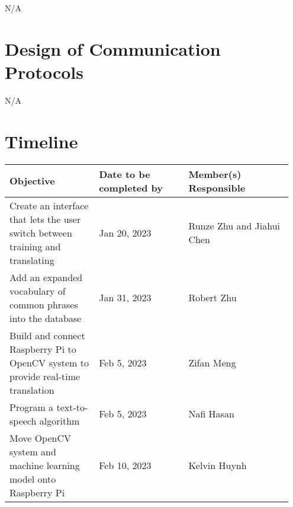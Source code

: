 \documentclass[12pt, titlepage]{article}
\begin{document}
N/A

\section{Design of Communication Protocols}

N/A

\section{Timeline}


\renewcommand{\arraystretch}{1.2}
\noindent \begin{tabularx}{\textwidth}{p{0.3\linewidth}|p{0.3\linewidth}|p{0.35\linewidth}}
\toprule
\textbf{Objective} & \textbf{Date to be completed by} & \textbf{Member(s) Responsible}\\
\midrule
Create an interface that lets the user switch between training and translating & Jan 20, 2023 & Runze Zhu and Jiahui Chen\\
\hline
Add an expanded vocabulary of common phrases into the database & Jan 31, 2023 & Robert Zhu\\
\hline
Build and connect Raspberry Pi to OpenCV system to provide real-time translation & Feb 5, 2023 & Zifan Meng\\
\hline
Program a text-to-speech algorithm & Feb 5, 2023 & Nafi Hasan\\
\hline
Move OpenCV system and machine learning model onto Raspberry Pi & Feb 10, 2023 & Kelvin Huynh\\
\bottomrule
\end{tabularx}

% 

\newpage{}

\appendix



\end{document}
